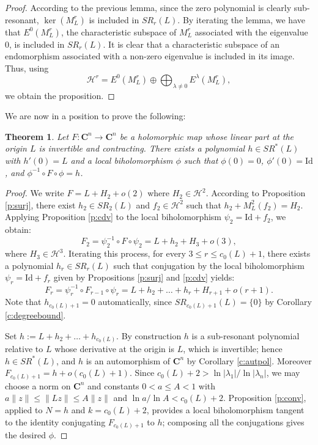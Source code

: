 \documentclass[english,11pt]{amsart}
\newtheorem{theorem}{Theorem}[section]
\theoremstyle{definition}
\theoremstyle{remark}
\numberwithin{equation}{section}
\newcommand{\C}{\mathbf{C}}
\begin{document}
\begin{proof}
According to the previous lemma, since the zero polynomial is clearly sub-resonant, $\ker(M_L^r)$ is included in $SR_r(L)$. By iterating the lemma, we have that $E^0(M_L^r)$, the characteristic subspace of $M_L^r$ associated with the eigenvalue $0$, is included in $SR_r(L)$. It is clear that a characteristic subspace of an endomorphism associated with a non-zero eigenvalue is included in its image. Thus, using
\[
\mathcal{H}^r = E^0(M_L^r) \oplus \bigoplus_{\lambda \neq 0} E^\lambda(M_L^r),
\]
we obtain the proposition.
\end{proof}

We are now in a position to prove the following:

\begin{theorem}\label{t:PDSR}
Let $F : \C^n \to \C^n$ be a holomorphic map whose linear part at the origin $L$ is invertible and contracting. There exists a polynomial $h \in SR^*(L)$ with $h'(0)=L$ and a local biholomorphism $\phi$ such that $\phi(0) = 0$, $\phi'(0) = \mathrm{Id}$, and $\phi^{-1} \circ F \circ \phi = h$.
\end{theorem}
\begin{proof}
    We write $F = L + H_2 + o(2)$ where $H_2 \in \mathcal{H}^2$. According to Proposition \ref{p:surj}, there exist $h_2 \in SR_2(L)$ and $f_2 \in \mathcal{H}^2$ such that $h_2 + M_L^2(f_2) = H_2$. Applying Proposition \ref{p:cdv} to the local biholomorphism $\psi_2 = \mathrm{Id} + f_2$, we obtain:
\[
F_2 = \psi_2^{-1} \circ F \circ \psi_2 = L + h_2 + H_3 + o(3),
\]
where $H_3 \in \mathcal{H}^3$. Iterating this process, for every $3 \leq r \leq c_0(L) + 1$, there exists a polynomial $h_r \in SR_r(L)$ such that conjugation by the local biholomorphism $\psi_r = \mathrm{Id} + f_r$ given by Propositions \ref{p:surj} and \ref{p:cdv} yields:
\[
F_r = \psi_r^{-1} \circ F_{r-1} \circ \psi_r = L + h_2 + \dots + h_r + H_{r+1} + o(r+1).
\]
Note that $h_{c_0(L)+1}=0$ automatically, since $SR_{c_0(L)+1}(L)=\{0\}$ by Corollary \ref{c:degreebound}.

Set $h := L + h_2 + \dots + h_{c_0(L)}$. By construction $h$ is a sub-resonant polynomial relative to $L$ whose derivative at the origin is $L$, which is invertible; hence $h \in SR^*(L)$, and $h$ is an automorphism of $\C^n$ by Corollary \ref{c:autpol}. Moreover $F_{c_0(L)+1}=h+o(c_0(L)+1)$. Since $c_0(L)+2>\ln|\lambda_1|/\ln|\lambda_n|$, we may choose a norm on $\C^n$ and constants $0<a\le A<1$ with $a\|z\|\le\|Lz\|\le A\|z\|$ and $\ln a/\ln A<c_0(L)+2$. Proposition \ref{p:conv}, applied to $N=h$ and $k=c_0(L)+2$, provides a local biholomorphism tangent to the identity conjugating $F_{c_0(L)+1}$ to $h$; composing all the conjugations gives the desired $\phi$.
\end{proof}
\end{document}
